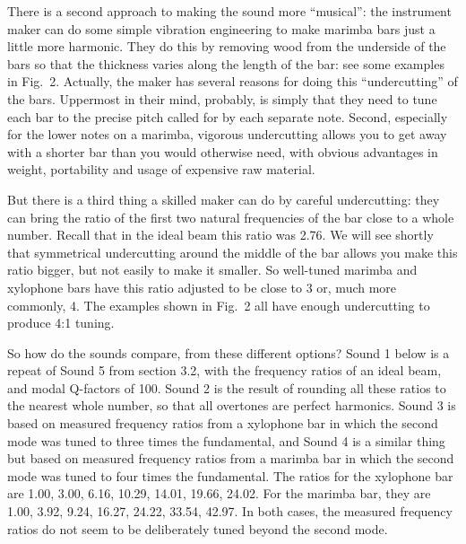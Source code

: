 

  There is a second approach to making the sound more ``musical'': the 
  instrument maker can do some simple vibration engineering to make marimba 
  bars just a little more harmonic. They do this by removing wood from the 
  underside of the bars so that the thickness varies along the length of the 
  bar: see some examples in Fig.\ 2. Actually, the maker has several reasons 
  for doing this ``undercutting'' of the bars. Uppermost in their mind, 
  probably, is simply that they need to tune each bar to the precise pitch 
  called for by each separate note. Second, especially for the lower notes on a 
  marimba, vigorous undercutting allows you to get away with a shorter bar than 
  you would otherwise need, with obvious advantages in weight, portability and 
  usage of expensive raw material. 


  But there is a third thing a skilled maker can do by careful undercutting: 
  they can bring the ratio of the first two natural frequencies of the bar 
  close to a whole number. Recall that in the ideal beam this ratio was 2.76. 
  We will see shortly that symmetrical undercutting around the middle of the 
  bar allows you make this ratio bigger, but not easily to make it smaller. So 
  well-tuned marimba and xylophone bars have this ratio adjusted to be close to 
  3 or, much more commonly, 4. The examples shown in Fig.\ 2 all have enough 
  undercutting to produce 4:1 tuning. 

  So how do the sounds compare, from these different options? Sound 1 below is 
  a repeat of Sound 5 from section 3.2, with the frequency ratios of an ideal 
  beam, and modal Q-factors of 100. Sound 2 is the result of rounding all these 
  ratios to the nearest whole number, so that all overtones are perfect 
  harmonics. Sound 3 is based on measured frequency ratios from a xylophone bar 
  in which the second mode was tuned to three times the fundamental, and Sound 
  4 is a similar thing but based on measured frequency ratios from a marimba 
  bar in which the second mode was tuned to four times the fundamental. The 
  ratios for the xylophone bar are 1.00, 3.00, 6.16, 10.29, 14.01, 19.66, 
  24.02. For the marimba bar, they are 1.00, 3.92, 9.24, 16.27, 24.22, 33.54, 
  42.97. In both cases, the measured frequency ratios do not seem to be 
  deliberately tuned beyond the second mode. 

